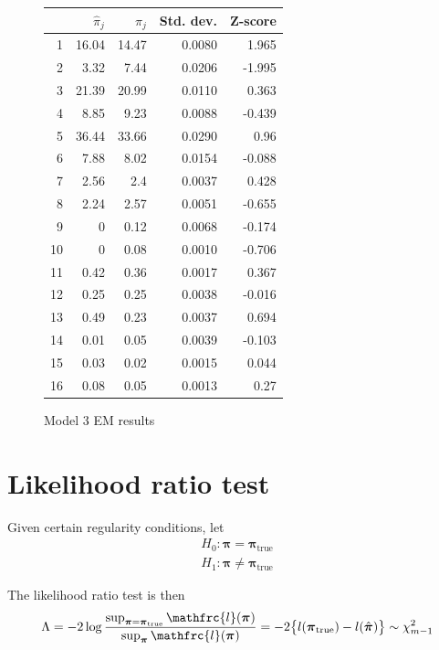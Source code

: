 \documentclass[12pt]{amsart}
\newcommand{\vect}[1]{\boldsymbol{\mathbf{#1}}}
\newcommand{\eqn}[1]{\begin{align*}
#1
\end{align*}}
\newcommand{\bl}{\big\{}
\newcommand{\br}{\big\}}
\newcommand{\vp}{\vect{\pi}}
\newcommand{\vph}{\hat{\vect{\pi}}}
\newcommand{\llp}{\mathfrc{l}(\vect{\pi})}
\begin{document}
\begin{figure}

\begin{tabular}{r| r| r| r| r|}
		& $\hat{\pi}_j$ & $\pi_j$ & Std. dev. & Z-score	\\
		\hline
1	& 16.04   &     14.47   &         0.0080    &    1.965      \\
2	&  3.32   &      7.44   &         0.0206   &   -1.995      \\
3	& 21.39   &     20.99   &         0.0110   &    0.363      \\
4	&  8.85   &      9.23   &         0.0088    &   -0.439      \\
5	& 36.44   &     33.66   &         0.0290   &     0.96      \\
6	&  7.88   &      8.02   &         0.0154   &   -0.088      \\
7	&  2.56   &       2.4   &         0.0037    &    0.428      \\
8	&  2.24   &      2.57   &         0.0051    &   -0.655      \\
9	&     0   &      0.12   &         0.0068    &   -0.174      \\
10	&     0   &      0.08   &         0.0010    &   -0.706      \\
11	&  0.42   &      0.36   &         0.0017   &    0.367      \\
12	&  0.25   &      0.25   &         0.0038    &   -0.016      \\
13	&  0.49   &      0.23   &         0.0037    &    0.694      \\
14	&  0.01   &      0.05   &         0.0039    &   -0.103      \\
15	&  0.03   &      0.02   &         0.0015    &    0.044      \\
16	&  0.08   &      0.05   &         0.0013    &     0.27      \\   		\end{tabular}
\caption{Model 3 EM results}
\end{figure}
               

\clearpage
\section{Likelihood ratio test}
Given certain regularity conditions, let
\eqn{
	H_0: \vp = \vp_\text{true}	\\
	H_1: \vp \neq \vp_\text{true}
}

The likelihood ratio test is then
\eqn{
	\Lambda = -2 \log \frac{ \sup_{\vp=\vp_\text{true}} \llp}{ \sup_{\vp} \llp }  = -2\bl l(\vp_\text{true}) - l(\vph) \br \sim \chi^2_{m-1}	\\
}
\end{document}
